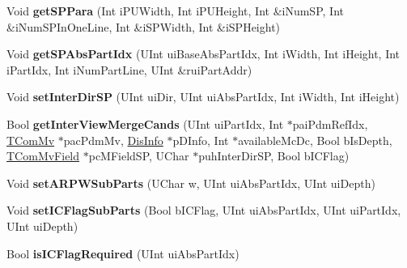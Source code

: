 \begin{DoxyCompactItemize}
\item 
\mbox{\label{class_t_com_data_c_u_aa8d1307b6ab1e3f0d830079e749c3d4e}} 
Void {\bfseries get\+S\+P\+Para} (Int i\+P\+U\+Width, Int i\+P\+U\+Height, Int \&i\+Num\+SP, Int \&i\+Num\+S\+P\+In\+One\+Line, Int \&i\+S\+P\+Width, Int \&i\+S\+P\+Height)
\item 
\mbox{\label{class_t_com_data_c_u_a33d2d1f1fd3f6281fc4e106950752cdb}} 
Void {\bfseries get\+S\+P\+Abs\+Part\+Idx} (U\+Int ui\+Base\+Abs\+Part\+Idx, Int i\+Width, Int i\+Height, Int i\+Part\+Idx, Int i\+Num\+Part\+Line, U\+Int \&rui\+Part\+Addr)
\item 
\mbox{\label{class_t_com_data_c_u_a64d630899c1c235a6ded3ec62fc73268}} 
Void {\bfseries set\+Inter\+Dir\+SP} (U\+Int ui\+Dir, U\+Int ui\+Abs\+Part\+Idx, Int i\+Width, Int i\+Height)
\item 
\mbox{\label{class_t_com_data_c_u_a95b817bf83719cdd29f5d9053d9fcff4}} 
Bool {\bfseries get\+Inter\+View\+Merge\+Cands} (U\+Int ui\+Part\+Idx, Int $\ast$pai\+Pdm\+Ref\+Idx, \hyperlink{class_t_com_mv}{T\+Com\+Mv} $\ast$pac\+Pdm\+Mv, \hyperlink{struct___dis_cand}{Dis\+Info} $\ast$p\+D\+Info, Int $\ast$available\+Mc\+Dc, Bool b\+Is\+Depth, \hyperlink{class_t_com_mv_field}{T\+Com\+Mv\+Field} $\ast$pc\+M\+Field\+SP, U\+Char $\ast$puh\+Inter\+Dir\+SP, Bool b\+I\+C\+Flag)
\item 
\mbox{\label{class_t_com_data_c_u_affe922f6551700f5410548ae20e4dab7}} 
Void {\bfseries set\+A\+R\+P\+W\+Sub\+Parts} (U\+Char w, U\+Int ui\+Abs\+Part\+Idx, U\+Int ui\+Depth)
\item 
\mbox{\label{class_t_com_data_c_u_ad58dfc1d9d2d4650703bcadddb082f01}} 
Void {\bfseries set\+I\+C\+Flag\+Sub\+Parts} (Bool b\+I\+C\+Flag, U\+Int ui\+Abs\+Part\+Idx, U\+Int ui\+Part\+Idx, U\+Int ui\+Depth)
\item 
\mbox{\label{class_t_com_data_c_u_ac2b8df428031343633635b98b7a1f28e}} 
Bool {\bfseries is\+I\+C\+Flag\+Required} (U\+Int ui\+Abs\+Part\+Idx)
\item 
\mbox{\label{class_t_com_data_c_u_af502b28af88f5806255a24fb4d7bed93}} 

\end{DoxyCompactItemize}
